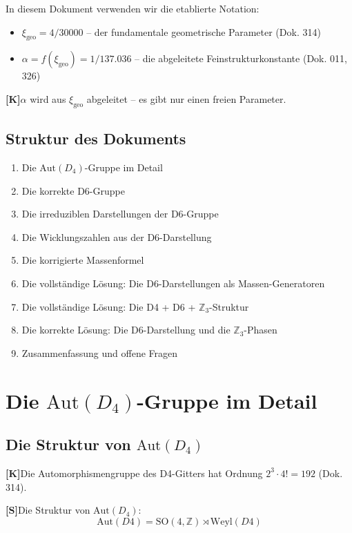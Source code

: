 \documentclass[11pt,a4paper]{article}
\newcommand{\xigeo}{\xi_{\text{geo}}}
\newcommand{\Kstatus}{\textbf{[K]}}
\newcommand{\Sstatus}{\textbf{[S]}}
\begin{document}
	In diesem Dokument verwenden wir die etablierte Notation:
	\begin{itemize}
		\item $\xigeo = 4/30000$ – der fundamentale geometrische Parameter (Dok. 314)
		\item $\alpha = f(\xigeo) = 1/137.036$ – die abgeleitete Feinstrukturkonstante (Dok. 011, 326)
	\end{itemize}
	
	\Kstatus $\alpha$ wird aus $\xigeo$ abgeleitet – es gibt nur einen freien Parameter.
	
	\subsection{Struktur des Dokuments}
	
	\begin{enumerate}
		\item Die $\text{Aut}(D_4)$-Gruppe im Detail
		\item Die korrekte D6-Gruppe
		\item Die irreduziblen Darstellungen der D6-Gruppe
		\item Die Wicklungszahlen aus der D6-Darstellung
		\item Die korrigierte Massenformel
		\item Die vollständige Lösung: Die D6-Darstellungen als Massen-Generatoren
		\item Die vollständige Lösung: Die D4 + D6 + $\mathbb{Z}_3$-Struktur
		\item Die korrekte Lösung: Die D6-Darstellung und die $\mathbb{Z}_3$-Phasen
		\item Zusammenfassung und offene Fragen
	\end{enumerate}
	
	\section{Die $\text{Aut}(D_4)$-Gruppe im Detail}
	
	\subsection{Die Struktur von $\text{Aut}(D_4)$}
	
	\Kstatus Die Automorphismengruppe des D4-Gitters hat Ordnung $2^3 \cdot 4! = 192$ (Dok. 314).
	
	\Sstatus Die Struktur von $\text{Aut}(D_4)$:
	\begin{equation}
		\text{Aut}(D4) = \text{SO}(4, \mathbb{Z}) \rtimes \text{Weyl}(D4)
	\end{equation}
	
\end{document}
